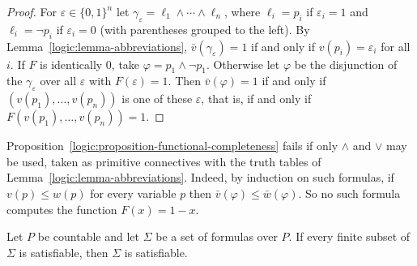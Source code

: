 \begin{proof}
For $\varepsilon \in \{0,1\}^n$ let
$\gamma_\varepsilon = \ell_1 \wedge \cdots \wedge \ell_n$, where $\ell_i = p_i$
if $\varepsilon_i = 1$ and $\ell_i = \neg p_i$ if $\varepsilon_i = 0$ (with
parentheses grouped to the left). By Lemma~\ref{logic:lemma-abbreviations},
$\bar v(\gamma_\varepsilon) = 1$ if and only if $v(p_i) = \varepsilon_i$ for
all $i$. If $F$ is identically $0$, take $\varphi = p_1 \wedge \neg p_1$.
Otherwise let $\varphi$ be the disjunction of the $\gamma_\varepsilon$ over all
$\varepsilon$ with $F(\varepsilon) = 1$. Then $\bar v(\varphi) = 1$ if and only
if $(v(p_1), \ldots, v(p_n))$ is one of these $\varepsilon$, that is, if and
only if $F(v(p_1), \ldots, v(p_n)) = 1$.
\end{proof}

\begin{counterexample}\label{logic:counterexample-monotone-connectives}
Proposition~\ref{logic:proposition-functional-completeness} fails if only
$\wedge$ and $\vee$ may be used, taken as primitive connectives with the
truth tables of Lemma~\ref{logic:lemma-abbreviations}. Indeed, by induction on
such formulas, if $v(p) \leq w(p)$ for every variable $p$ then
$\bar v(\varphi) \leq \bar w(\varphi)$. So no such formula computes the
function $F(x) = 1 - x$.
\end{counterexample}

\begin{theorem}\label{logic:theorem-propositional-compactness}
Let $P$ be countable and let $\Sigma$ be a set of formulas over $P$. If every
finite subset of $\Sigma$ is satisfiable, then $\Sigma$ is satisfiable.
\end{theorem}

